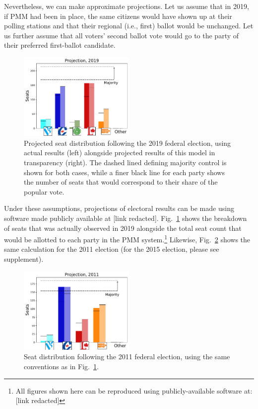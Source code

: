 Nevertheless, we can make approximate projections. Let us assume that in 2019, if PMM had been in place, the same citizens would have shown up at their polling stations and that their regional (i.e., first) ballot would be unchanged.
Let us further assume that all voters' second ballot vote would go to the party of their preferred first-ballot candidate.
\begin{figure}[h]
  \includegraphics[width=0.50\textwidth,clip]{PR_calcs/data/raw_2019/PMM_out/PMM_projections}
  \caption{ Projected seat distribution following the 2019 federal election, using actual results (left) alongside projected results of this model in transparency (right). The dashed lined defining majority control is shown for both cases, while a finer black line for each party shows the number of seats that would correspond to their share of the popular vote.
}
\label{fig:projection_2019}
\end{figure}
Under these assumptions, projections of electoral results can be made using software made publicly available at [link redacted]. 
Fig.~\ref{fig:projection_2019} shows the breakdown of seats that was actually observed in 2019 alongside the total seat count that would be allotted to each party in the PMM system.\footnote{All figures shown here can be reproduced using publicly-available software at:
[link redacted]
}
Likewise, Fig.~\ref{fig:projection_2011} shows the same calculation for the 2011 election (for the 2015 election, please see supplement).

\begin{figure}[h!]
  \includegraphics[width=0.50\textwidth,clip]{PR_calcs/data/raw_2011/PMM_out/PMM_projections}
  \caption{ Seat distribution following the 2011 federal election, using the same conventions as in Fig.~\ref{fig:projection_2019}.}
\label{fig:projection_2011}
\end{figure}

